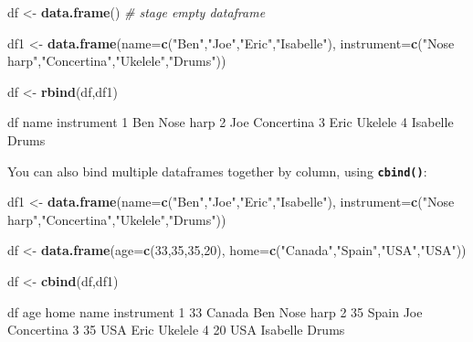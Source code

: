 \documentclass[
]{book}
\newenvironment{Shaded}{\begin{snugshade}}{\end{snugshade}}
\newcommand{\CommentTok}[1]{\textcolor[rgb]{0.56,0.35,0.01}{\textit{#1}}}
\newcommand{\DataTypeTok}[1]{\textcolor[rgb]{0.13,0.29,0.53}{#1}}
\newcommand{\DecValTok}[1]{\textcolor[rgb]{0.00,0.00,0.81}{#1}}
\newcommand{\KeywordTok}[1]{\textcolor[rgb]{0.13,0.29,0.53}{\textbf{#1}}}
\newcommand{\NormalTok}[1]{#1}
\newcommand{\StringTok}[1]{\textcolor[rgb]{0.31,0.60,0.02}{#1}}
\begin{document}
\begin{Shaded}
\begin{Highlighting}[]
\NormalTok{df <-}\StringTok{ }\KeywordTok{data.frame}\NormalTok{() }\CommentTok{# stage empty dataframe}

\NormalTok{df1 <-}\StringTok{ }\KeywordTok{data.frame}\NormalTok{(}\DataTypeTok{name=}\KeywordTok{c}\NormalTok{(}\StringTok{"Ben"}\NormalTok{,}\StringTok{"Joe"}\NormalTok{,}\StringTok{"Eric"}\NormalTok{,}\StringTok{"Isabelle"}\NormalTok{),}
                  \DataTypeTok{instrument=}\KeywordTok{c}\NormalTok{(}\StringTok{"Nose harp"}\NormalTok{,}\StringTok{"Concertina"}\NormalTok{,}\StringTok{"Ukelele"}\NormalTok{,}\StringTok{"Drums"}\NormalTok{))}

\NormalTok{df <-}\StringTok{ }\KeywordTok{rbind}\NormalTok{(df,df1)}

\NormalTok{df}
\NormalTok{      name instrument}
\DecValTok{1}\NormalTok{      Ben  Nose harp}
\DecValTok{2}\NormalTok{      Joe Concertina}
\DecValTok{3}\NormalTok{     Eric    Ukelele}
\DecValTok{4}\NormalTok{ Isabelle      Drums}
\end{Highlighting}
\end{Shaded}

You can also bind multiple dataframes together by column, using \textbf{\texttt{cbind()}}:

\begin{Shaded}
\begin{Highlighting}[]
\NormalTok{df1 <-}\StringTok{ }\KeywordTok{data.frame}\NormalTok{(}\DataTypeTok{name=}\KeywordTok{c}\NormalTok{(}\StringTok{"Ben"}\NormalTok{,}\StringTok{"Joe"}\NormalTok{,}\StringTok{"Eric"}\NormalTok{,}\StringTok{"Isabelle"}\NormalTok{),}
                  \DataTypeTok{instrument=}\KeywordTok{c}\NormalTok{(}\StringTok{"Nose harp"}\NormalTok{,}\StringTok{"Concertina"}\NormalTok{,}\StringTok{"Ukelele"}\NormalTok{,}\StringTok{"Drums"}\NormalTok{))}

\NormalTok{df <-}\StringTok{ }\KeywordTok{data.frame}\NormalTok{(}\DataTypeTok{age=}\KeywordTok{c}\NormalTok{(}\DecValTok{33}\NormalTok{,}\DecValTok{35}\NormalTok{,}\DecValTok{35}\NormalTok{,}\DecValTok{20}\NormalTok{), }\DataTypeTok{home=}\KeywordTok{c}\NormalTok{(}\StringTok{"Canada"}\NormalTok{,}\StringTok{"Spain"}\NormalTok{,}\StringTok{"USA"}\NormalTok{,}\StringTok{"USA"}\NormalTok{))}

\NormalTok{df <-}\StringTok{ }\KeywordTok{cbind}\NormalTok{(df,df1)}

\NormalTok{df}
\NormalTok{  age   home     name instrument}
\DecValTok{1}  \DecValTok{33}\NormalTok{ Canada      Ben  Nose harp}
\DecValTok{2}  \DecValTok{35}\NormalTok{  Spain      Joe Concertina}
\DecValTok{3}  \DecValTok{35}\NormalTok{    USA     Eric    Ukelele}
\DecValTok{4}  \DecValTok{20}\NormalTok{    USA Isabelle      Drums}
\end{Highlighting}
\end{Shaded}
\end{document}

